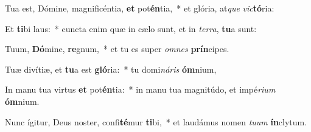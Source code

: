 \item Tua est, Dómine, magnificéntia, \textbf{et} pot\textbf{én}tia,~* et glória, at\textit{que} \textit{vic}\textbf{tó}ria:
\item Et \textbf{ti}bi laus:~* cuncta enim quæ in cælo sunt, et in \textit{ter}\textit{ra}, \textbf{tu}a sunt:
\item Tuum, \textbf{Dó}mine, \textbf{re}gnum,~* et tu es super \textit{om}\textit{nes} \textbf{prín}cipes.
\item Tuæ divítiæ, et \textbf{tu}a est \textbf{gló}ria:~* tu domi\textit{ná}\textit{ris} \textbf{óm}nium,
\item In manu tua virtus \textbf{et} pot\textbf{én}tia:~* in manu tua magnitúdo, et impé\textit{ri}\textit{um} \textbf{óm}nium.
\item Nunc ígitur, Deus noster, confi\textbf{té}mur \textbf{ti}bi,~* et laudámus nomen \textit{tu}\textit{um} \textbf{ín}clytum.
